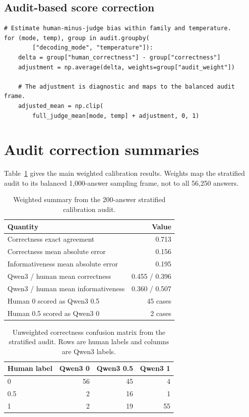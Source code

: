 \documentclass[11pt]{article}
\begin{document}
\subsection{Audit-based score correction}

\begin{lstlisting}
# Estimate human-minus-judge bias within family and temperature.
for (mode, temp), group in audit.groupby(
        ["decoding_mode", "temperature"]):
    delta = group["human_correctness"] - group["correctness"]
    adjustment = np.average(delta, weights=group["audit_weight"])

    # The adjustment is diagnostic and maps to the balanced audit frame.
    adjusted_mean = np.clip(
        full_judge_mean[mode, temp] + adjustment, 0, 1)
\end{lstlisting}

\section{Audit correction summaries}
\label{app:audit-tables}

Table~\ref{tab:audit-summary} gives the main weighted calibration results.
Weights map the stratified audit to its balanced 1,000-answer sampling frame,
not to all 56,250 answers.

\begin{table}[ht]
\centering
\small
\caption{Weighted summary from the 200-answer stratified calibration audit.}
\label{tab:audit-summary}
\begin{tabular}{lr}
\toprule
Quantity & Value \\
\midrule
Correctness exact agreement & 0.713 \\
Correctness mean absolute error & 0.156 \\
Informativeness mean absolute error & 0.195 \\
Qwen3 / human mean correctness & 0.455 / 0.396 \\
Qwen3 / human mean informativeness & 0.360 / 0.507 \\
Human 0 scored as Qwen3 0.5 & 45 cases \\
Human 0.5 scored as Qwen3 0 & 2 cases \\
\bottomrule
\end{tabular}
\end{table}

\begin{table}[ht]
\centering
\small
\caption{Unweighted correctness confusion matrix from the stratified audit.
Rows are human labels and columns are Qwen3 labels.}
\label{tab:audit-confusion}
\begin{tabular}{lrrr}
\toprule
Human label & Qwen3 0 & Qwen3 0.5 & Qwen3 1 \\
\midrule
0 & 56 & 45 & 4 \\
0.5 & 2 & 16 & 1 \\
1 & 2 & 19 & 55 \\
\bottomrule
\end{tabular}
\end{table}
\end{document}
